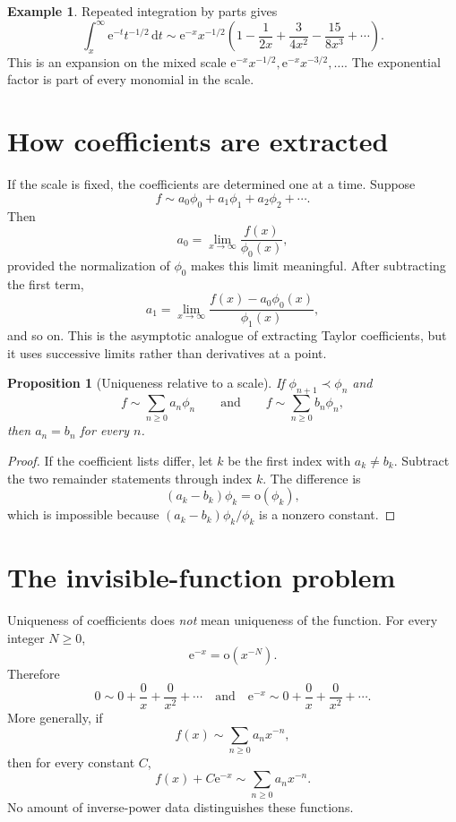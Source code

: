 \documentclass[11pt,openany]{book}
\theoremstyle{definition}
\newtheorem{example}{Example}[chapter]
\theoremstyle{plain}
\newtheorem{proposition}{Proposition}[chapter]
\theoremstyle{remark}
\newcommand{\dd}{\,\mathrm{d}}
\newcommand{\e}{\mathrm{e}}
\newcommand{\smallo}{\mathrm{o}}
\newcommand{\asym}{\sim}
\newcommand{\precdom}{\prec}
\begin{document}
\begin{example}
Repeated integration by parts gives
\[
 \int_x^\infty \e^{-t}t^{-1/2}\dd t
 \asym \e^{-x}x^{-1/2}
 \left(1-\frac1{2x}+\frac{3}{4x^2}-\frac{15}{8x^3}+\cdots\right).
\]
This is an expansion on the mixed scale
\(
 \e^{-x}x^{-1/2},\e^{-x}x^{-3/2},\ldots
\).
The exponential factor is part of every monomial in the scale.
\end{example}

\section{How coefficients are extracted}

If the scale is fixed, the coefficients are determined one at a time. Suppose
\[
 f\asym a_0\phi_0+a_1\phi_1+a_2\phi_2+\cdots.
\]
Then
\[
 a_0=\lim_{x\to\infty}\frac{f(x)}{\phi_0(x)},
\]
provided the normalization of $\phi_0$ makes this limit meaningful. After subtracting the first term,
\[
 a_1=\lim_{x\to\infty}
 \frac{f(x)-a_0\phi_0(x)}{\phi_1(x)},
\]
and so on. This is the asymptotic analogue of extracting Taylor coefficients, but it uses successive limits rather than derivatives at a point.

\begin{proposition}[Uniqueness relative to a scale]
If $\phi_{n+1}\precdom\phi_n$ and
\[
 f\asym\sum_{n\ge0}a_n\phi_n
 \qquad\text{and}\qquad
 f\asym\sum_{n\ge0}b_n\phi_n,
\]
then $a_n=b_n$ for every $n$.
\end{proposition}

\begin{proof}
If the coefficient lists differ, let $k$ be the first index with $a_k\ne b_k$. Subtract the two remainder statements through index $k$. The difference is
\[
 (a_k-b_k)\phi_k=\smallo(\phi_k),
\]
which is impossible because $(a_k-b_k)\phi_k/\phi_k$ is a nonzero constant.
\end{proof}

\section{The invisible-function problem}

Uniqueness of coefficients does \emph{not} mean uniqueness of the function. For every integer $N\ge0$,
\[
 \e^{-x}=\smallo(x^{-N}).
\]
Therefore
\[
 0\asym 0+\frac0x+\frac0{x^2}+\cdots
 \quad\text{and}\quad
 \e^{-x}\asym 0+\frac0x+\frac0{x^2}+\cdots.
\]
More generally, if
\[
 f(x)\asym\sum_{n\ge0}a_nx^{-n},
\]
then for every constant $C$,
\[
 f(x)+C\e^{-x}\asym\sum_{n\ge0}a_nx^{-n}.
\]
No amount of inverse-power data distinguishes these functions.
\end{document}
